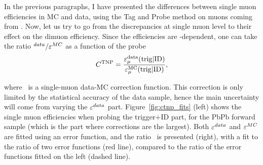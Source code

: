 In the previous paragraphs, I have presented the differences between
single muon efficiencies in MC and data, using the Tag and Probe
method on muons coming from \Jpsi. Now, let us try to go from the
discrepancies at single muon level to their effect on the dimuon efficiency. Since the efficiencies are
\pt-dependent, one can take the ratio \eff$^{data} / \varepsilon^{MC}$ as a
function of the probe~\pt
\begin{equation}
C^{\text{TNP}}  = \frac{\varepsilon_{\mu}^{\rm data}(\rm trig|ID)}{{\varepsilon_{\mu}^{\rm
      MC}(\rm trig|ID)}},
\label{eq:ctnp}
\end{equation}

where \Ctnp\ is a single-muon data-MC correction function. This
correction is only limited by the statistical accuracy of the
data sample, hence the main uncertainty will come from varying the
$\varepsilon^{data}$ part. Figure~\ref{fig:ctnp_fits} (left) shows the single
muon efficiencies when probing the trigger+ID part, for the PbPb
forward sample (which is the part where corrections are the
largest). Both $\varepsilon^{data}$ and $\varepsilon^{MC}$ are fitted using an error
function, and the ratio \Ctnp\ is presented (right), with a fit to the
ratio of two error functions (red line), compared to the ratio of the
error functions fitted on the left (dashed line).

